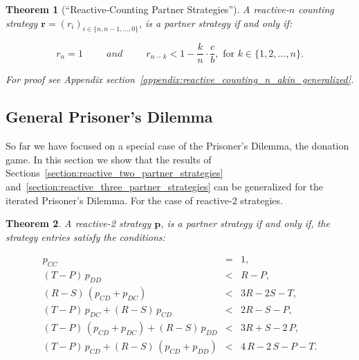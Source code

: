 \documentclass[11pt]{article}
\theoremstyle{plainCl1}
\newtheorem{theorem}{Theorem}
\theoremstyle{plainCl2}
\begin{document}
\begin{theorem}[``Reactive-Counting Partner Strategies'']\label{theorem:reactive_counting_partner_strategies}
A reactive-$n$ counting strategy $\mathbf{r}=(r_i)_{i \in \{n, n-1, \dots, 0\}}$,
is a partner strategy if and only if:

\begin{equation}
  r_n = 1 \qquad ~~and~~ \qquad r_{n - k} < 1 - \frac{k}{n} \cdot \frac{c}{b}, \text{ for } k \in \{1, 2, \dots, n\}.
\end{equation}

For proof see Appendix section~\ref{appendix:reactive_counting_n_akin_generalized}.

\end{theorem}


\subsection{General Prisoner's Dilemma}\label{section:general_prisoners_dilemma}

So far we have focused on a special case of the Prisoner's Dilemma, the donation
game. In this section we show that the results of Sections~\ref{section:reactive_two_partner_strategies}
and~\ref{section:reactive_three_partner_strategies} can be generalized
for the iterated Prisoner's Dilemma. For the case of reactive-2 strategies.


\begin{theorem}\label{theorem:reactive_two_partner_strategies_PD}
A reactive-2 strategy $\mathbf{p}$, is a partner strategy if and only if,
the strategy entries satisfy the conditions:

\begin{equation*}
  \begin{array}{ccc}
    p_{CC} & = & 1, \\ [0.2cm]
    (T - P)\, p_{DD} & < & R - P, \\ [0.2cm]
    (R - S)\, (p_{CD} + p_{DC}) & < & 3 R - 2 S - T, \\ [0.2cm]
    (T - P)\, p_{DC}  + (R - S)\, p_{CD} & < & 2 R - S - P, \\ [0.2cm]
    (T - P)\, (p_{CD} + p_{DC}) + (R - S)\, p_{DD}  & < & 3 R + S - 2\,P, \\ [0.2cm]
    (T - P)\, p_{CD}  + (R - S)\, (p_{CD} + p_{DD}) & < & 4\,R - 2\,S - P - T.
\end{array}
\end{equation*}
\end{theorem}
\end{document}
